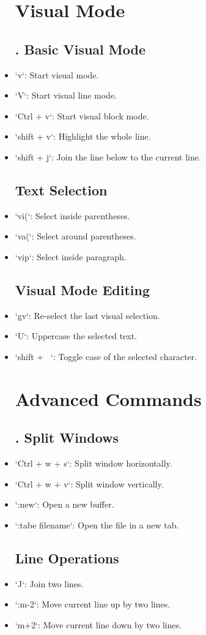 \documentclass{report}
\begin{document}
\begin{itemize}
	\section{Visual Mode}
	\subsection{. Basic Visual Mode}
\item `v`: Start visual mode.
\item `V`: Start visual line mode.
\item `Ctrl + v`: Start visual block mode.
\item `shift + v`: Highlight the whole line.
\item `shift + j`: Join the line below to the current line.
	\subsection{Text Selection}
\item `vi(`: Select inside parentheses.
\item `va(`: Select around parentheses.
\item `vip`: Select inside paragraph.
	\subsection{Visual Mode Editing}
\item `gv`: Re-select the last visual selection.
\item `U`: Uppercase the selected text.
\item `shift + ~`: Toggle case of the selected character.
	\section{Advanced Commands}
	\subsection{. Split Windows}
\item `Ctrl + w + s`: Split window horizontally.
\item `Ctrl + w + v`: Split window vertically.
\item `:new`: Open a new buffer.
\item `:tabe filename`: Open the file in a new tab.
	\subsection{Line Operations}
\item `J`: Join two lines.
\item `:m-2`: Move current line up by two lines.
\item `m+2`: Move current line down by two lines.

\end{itemize}
\end{document}

